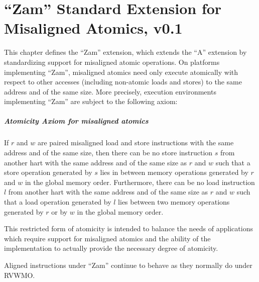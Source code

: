 \chapter{``Zam'' Standard Extension for Misaligned Atomics, v0.1}
\label{sec:zam}

This chapter defines the ``Zam'' extension, which extends the ``A'' extension by standardizing support for misaligned atomic operations.
On platforms implementing ``Zam'', misaligned atomics need only execute atomically with respect
to other accesses (including non-atomic loads and stores) to the same address and of the same size.
More precisely, execution environments implementing ``Zam'' are subject to the following axiom:

\newcommand{\misalignedatomicityaxiom}{If $r$ and $w$ are paired misaligned load and store instructions with the same address and of the same size, then there can be no store instruction $s$ from another hart with the same address and of the same size as $r$ and $w$ such that a store operation generated by $s$ lies in between memory operations generated by $r$ and $w$ in the global memory order.  Furthermore, there can be no load instruction $l$ from another hart with the same address and of the same size as $r$ and $w$ such that a load operation generated by $l$ lies between two memory operations generated by $r$ or by $w$ in the global memory order.}

\vspace{-0.2in}
\paragraph{Atomicity Axiom for misaligned atomics}
\label{rvwmo:ax:misaligned}
\misalignedatomicityaxiom

This restricted form of atomicity is intended to balance the needs of applications which require support for misaligned atomics and the ability of the implementation to actually provide the necessary degree of atomicity.

Aligned instructions under ``Zam'' continue to behave as they normally do under RVWMO.

